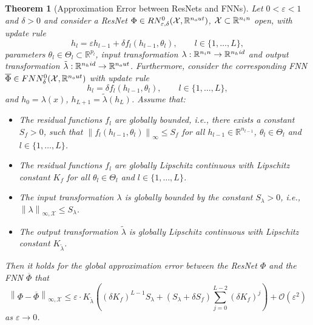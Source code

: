 \documentclass[10pt,a4paper]{amsart}
\newtheorem{theorem}{Theorem}
\newcommand{\R}{\mathbb{R}}
\newcommand{\eps}{\varepsilon}
\newcommand*{\nhid}{n_\textup{hid}}
\newcommand*{\nin}{n_\textup{in}}
\newcommand\norm[1]{\left\lVert#1\right\rVert}
\newcommand*{\nout}{n_\textup{out}}
\begin{document}
\begin{theorem}[Approximation Error between ResNets and FNNs] \label{th:mlp_resnet_error}   
	Let $0<\eps<1$ and $\delta>0$ and consider a ResNet $\Phi \in \textup{RN}^0_{\eps,\delta}(\mathcal{X},\R^{\nout})$, $\mathcal{X}\subset \R^{\nin}$ open, with update rule
	\begin{equation*}
		h_l = \eps h_{l-1} + \delta f_l(h_{l-1},\theta_l), \qquad l \in \{1,\ldots,L\},
	\end{equation*}
    parameters $\theta_l\in \Theta_l \subset \R^{p_l}$, input transformation $\lambda:\R^{\nin} \rightarrow \R^{\nhid}$ and output transformation $\tilde{\lambda}: \R^{\nhid} \rightarrow \R^{\nout}$.
	Furthermore, consider the corresponding FNN $\overline{\Phi} \in \textup{FNN}^0_{\delta}(\mathcal{X},\R^{\nout})$ with update rule
	\begin{equation*}
		h_l = \delta f_l(h_{l-1},\theta_l), \qquad l \in \{1,\ldots,L\},
	\end{equation*}
	and $h_0 = \lambda(x)$, $h_{L+1} = \tilde{\lambda}(h_L)$. Assume that:
	\begin{itemize}
		\item The residual functions $f_l$ are globally bounded, i.e., there exists a constant $S_f>0$, such that $\norm{f_l(h_{l-1},\theta_l)}_\infty \leq S_f$ for all $h_{l-1} \in \R^{n_{l-1}}$, $\theta_l \in \Theta_l$ and $l \in \{1,\ldots,L\}$. 
        \item The residual functions $f_l$ are globally Lipschitz continuous with Lipschitz constant $K_f$ for all $\theta_l\in\Theta_l$ and $l \in \{1,\ldots,L\}$.  
        \item The input transformation $\lambda$ is globally bounded by the constant $S_\lambda>0$, i.e., $\norm{\lambda}_{\infty,\mathcal{X}}\leq S_\lambda$.
        \item The output transformation $\tilde{\lambda}$ is globally Lipschitz continuous with Lipschitz constant $K_{\tilde{\lambda}}$.
	\end{itemize}
	Then it holds for the global approximation error between the ResNet $\Phi$ and the FNN $\overline{\Phi}$ that
    \begin{equation}\label{eq:error_resnet_mlp}
	   \norm{\Phi-\overline{\Phi}}_{\infty,\mathcal{X}} \leq \eps \cdot K_{\tilde{\lambda}} \left(  (\delta K_f)^{L-1} S_\lambda + (S_\lambda +\delta S_f)  \sum_{j = 0}^{L-2} (\delta K_f)^j\right)  + \mathcal{O}(\eps^2)
    \end{equation}
    as $\eps \rightarrow 0$.
\end{theorem}
\end{document}
